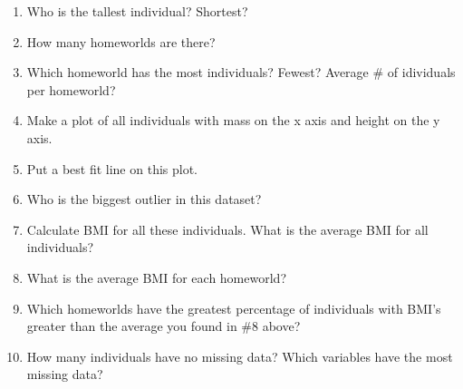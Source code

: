 \documentclass[
]{book}
\providecommand{\tightlist}{%
  \setlength{\itemsep}{0pt}\setlength{\parskip}{0pt}}
\begin{document}
\begin{enumerate}
\def\labelenumi{\arabic{enumi}.}
\tightlist
\item
  Who is the tallest individual? Shortest?
\item
  How many homeworlds are there?
\item
  Which homeworld has the most individuals? Fewest? Average \# of idividuals per homeworld?
\item
  Make a plot of all individuals with mass on the x axis and height on the y axis.
\item
  Put a best fit line on this plot.
\item
  Who is the biggest outlier in this dataset?
\item
  Calculate BMI for all these individuals. What is the average BMI for all individuals?
\item
  What is the average BMI for each homeworld?
\item
  Which homeworlds have the greatest percentage of individuals with BMI's greater than the average you found in \#8 above?
\item
  How many individuals have no missing data? Which variables have the most missing data?
\end{enumerate}

  
\end{document}
